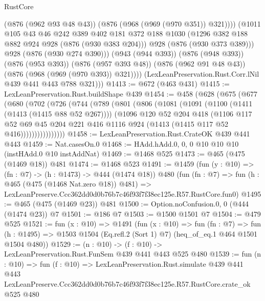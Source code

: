 \begin{lexlean}{RustCore}
\begin{coremodule}
                  (@876 (@962 @93 @48 @43))
                  (@876 (@968 (@969 (@970 @351)) @321))))
              (@1011
                @105
                @43
                @46
                @242
                @389
                @402
                @181
                @372
                @188
                @1030
                (@1296 @382 @188 @882 @924 @928 (@876 (@930 @383 @204)))
                @928
                (@876 (@930 @373 @389)))
              @928
              (@876 (@930 @274 @390)))
            (@943 (@944 @393))
            (@876 (@948 @393))
            (@876 (@953 @393))
            (@876 (@957 @393 @48))
            (@876 (@962 @91 @48 @43))
            (@876 (@968 (@969 (@970 @393)) @321))))
        (LexLeanPreservation.Rust.Corr.lNil @439 @441 @443 @788 @321)))
@1413 := @672 (@463 @431)
@1415 := LexLeanPreservation.Rust.buildShape @439
@1454 := @458
    (@628
      (@675
        (@677
          (@680
            (@702
              (@726
                (@744
                  (@789
                    (@801
                      (@806
                        (@1081
                          (@1091
                            (@1100 (@1411 (@1413 (@1415 @88 @52 @267))))
                            (@1096
                              @120
                              @52
                              @204
                              @418
                              (@1106
                                @117
                                @52
                                @69
                                @45
                                @204
                                @221
                                @416
                                @1116
                                @924
                                (@1413 (@1415 @117 @52 @416))))))))))))))))
@1458 := LexLeanPreservation.Rust.CrateOK @439 @441 @443
@1459 := Nat.casesOn.{0}
@1468 := HAdd.hAdd.{0, 0, 0} @10 @10 @10 (instHAdd.{0} @10 instAddNat)
@1469 := @1468 @525
@1473 := @465 (@475 (@1469 @18)) @481
@1474 := @1468 @523
@1491 := @1459
    (fun (y : @10) => (fn : @7) -> (h : @1473) -> @444 (@1474 @18))
    @480
    (fun (fn : @7) =>
    fun (h : @465 (@475 (@1468 Nat.zero @18)) @481) =>
    LexLeanPreserve.Ccc362dd0d0b76b7c46f93f7f38ec125e.R57.RustCore.fun0)
@1495 := @465 (@475 (@1469 @23)) @481
@1500 := Option.noConfusion.{0, 0} (@444 (@1474 @23)) @7
@1501 := @186 @7
@1503 := @1500 @1501 @7
@1504 := @479 @525
@1521 := fun (x : @10) =>
  @1491
    (fun (x : @10) =>
    fun (fn : @7) =>
    fun (h : @1495) => @1503 @1504 (Eq.refl.{2} (Sort 1) @7) (heq_of_eq.{1} @464 @1501 @1504 @480))
@1529 := (n : @10) -> (f : @10) -> LexLeanPreservation.Rust.FunSem @439 @441 @443 @525 @480
@1539 := fun (n : @10) =>
  fun (f : @10) =>
  LexLeanPreservation.Rust.simulate
    @439
    @441
    @443
    LexLeanPreserve.Ccc362dd0d0b76b7c46f93f7f38ec125e.R57.RustCore.crate_ok
    @525
    @480
\end{coremodule}
\end{lexlean}
